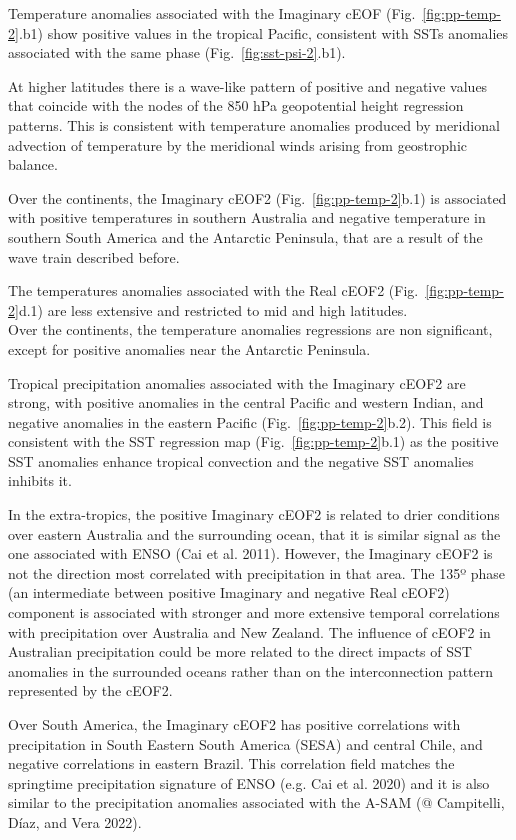 \documentclass[smallextended]{svjour3}       %
\begin{document}
Temperature anomalies associated with the Imaginary cEOF (Fig.~\ref{fig:pp-temp-2}.b1) show positive values in the tropical Pacific, consistent with SSTs anomalies associated with the same phase (Fig.~\ref{fig:sst-psi-2}.b1).

At higher latitudes there is a wave-like pattern of positive and negative values that coincide with the nodes of the 850 hPa geopotential height regression patterns.
This is consistent with temperature anomalies produced by meridional advection of temperature by the meridional winds arising from geostrophic balance.

Over the continents, the Imaginary cEOF2 (Fig.~\ref{fig:pp-temp-2}b.1) is associated with positive temperatures in southern Australia and negative temperature in southern South America and the Antarctic Peninsula, that are a result of the wave train described before.

The temperatures anomalies associated with the Real cEOF2 (Fig.~\ref{fig:pp-temp-2}d.1) are less extensive and restricted to mid and high latitudes.\\
Over the continents, the temperature anomalies regressions are non significant, except for positive anomalies near the Antarctic Peninsula.

Tropical precipitation anomalies associated with the Imaginary cEOF2 are strong, with positive anomalies in the central Pacific and western Indian, and negative anomalies in the eastern Pacific (Fig.~\ref{fig:pp-temp-2}b.2).
This field is consistent with the SST regression map (Fig.~\ref{fig:pp-temp-2}b.1) as the positive SST anomalies enhance tropical convection and the negative SST anomalies inhibits it.

In the extra-tropics, the positive Imaginary cEOF2 is related to drier conditions over eastern Australia and the surrounding ocean, that it is similar signal as the one associated with ENSO (Cai et al. 2011).
However, the Imaginary cEOF2 is not the direction most correlated with precipitation in that area.
The 135º phase (an intermediate between positive Imaginary and negative Real cEOF2) component is associated with stronger and more extensive temporal correlations with precipitation over Australia and New Zealand.
The influence of cEOF2 in Australian precipitation could be more related to the direct impacts of SST anomalies in the surrounded oceans rather than on the interconnection pattern represented by the cEOF2.

Over South America, the Imaginary cEOF2 has positive correlations with precipitation in South Eastern South America (SESA) and central Chile, and negative correlations in eastern Brazil. This correlation field matches the springtime precipitation signature of ENSO (e.g. Cai et al. 2020) and it is also similar to the precipitation anomalies associated with the A-SAM (@ Campitelli, Díaz, and Vera 2022).
\end{document}
